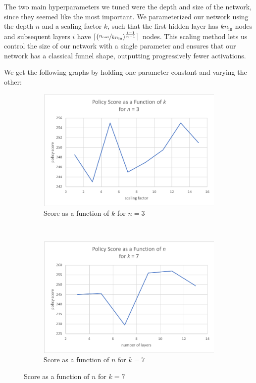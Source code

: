 \documentclass{article}
\begin{document}
The two main hyperparameters we tuned were the depth and size of the network, since they seemed like the most important. We parameterized our network using the depth $n$ and a scaling factor $k$, such that the first hidden layer has $kn_{\text{in}}$ nodes and subsequent layers $i$ have $\lceil (\nicefrac{n_{\text{out}}}{kn_{\text{in}}})^{\frac{i - 1}{n - 1}} \rceil$ nodes. This scaling method lets us control the size of our network with a single parameter and ensures that our network has a classical funnel shape, outputting progressively fewer activations. 

We get the following graphs by holding one parameter constant and varying the other: 

\FloatBarrier
\begin{figure}[h]
	\centering
	\begin{subfigure}{0.4\textwidth}
		\includegraphics[width=\textwidth]{k_graph}
		\caption{Score as a function of $k$ for $n = 3$}
	\end{subfigure}
	~
	\begin{subfigure}{0.4\textwidth}
		\includegraphics[width=\textwidth]{n_graph}
		\caption{Score as a function of $n$ for $k = 7$}
	\end{subfigure}
\end{figure}
\FloatBarrier
\end{document}
